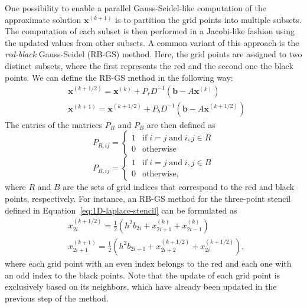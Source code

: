 One possibility to enable a parallel Gauss-Seidel-like computation of the approximate solution $\bm{x}^{(k+1)}$ is to partition the grid points into multiple subsets.
The computation of each subset is then performed in a Jacobi-like fashion using the updated values from other subsets.
A common variant of this approach is the \emph{red-black} Gauss-Seidel (RB-GS) method.
Here, the grid points are assigned to two distinct subsets, where the first represents the red and the second one the black points.
We can define the RB-GS method in the following way:
\begin{equation}
	\begin{split}
		& \bm{x}^{(k+1/2)} = \bm{x}^{(k)} + P_r D^{-1} (\bm{b} - A \bm{x}^{(k)}) \\
		& \bm{x}^{(k+1)} = \bm{x}^{(k+1/2)} + P_b D^{-1} (\bm{b} - A \bm{x}^{(k+1/2)})
	\end{split}
\end{equation}
The entries of the matrices $P_R$ and $P_B$ are then defined as
\begin{equation}
	P_{R,ij} = \begin{cases}
	1 & \text{if} \; i = j \; \text{and} \; i,j \in R \\
	0 & \text{otherwise} 
	\end{cases}
\end{equation}
\begin{equation}
	P_{B,ij} = \begin{cases}
		1 & \text{if} \; i = j \; \text{and} \; i,j \in B \\
		0 & \text{otherwise},
	\end{cases}
\end{equation}
where $R$ and $B$ are the sets of grid indices that correspond to the red and black points, respectively.
For instance, an RB-GS method for the three-point stencil defined in Equation~\eqref{eq:1D-laplace-stencil} can be formulated as
\begin{equation}
\begin{split}
   	& x_{2i}^{(k+1/2)} = \frac {1}{2}\left(h^2 b_{2i} + x_{2i+1}^{(k)} + x_{2i-1}^{(k)}\right) \\
    & x_{2i+1}^{(k+1)} = \frac {1}{2}\left(h^2 b_{2i+1} + x_{2i+2}^{(k+1/2)} + x_{2i}^{(k+1/2)}\right),
\end{split}
\end{equation}
where each grid point with an even index belongs to the red and each one with an odd index to the black points.
Note that the update of each grid point is exclusively based on its neighbors, which have already been updated in the previous step of the method.
